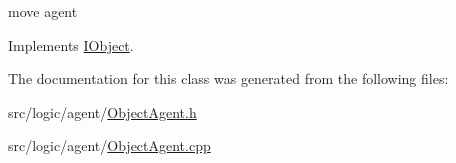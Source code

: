 move agent 



Implements \hyperlink{class_i_object_a1bbc27b2cecbda3cf57fd6ed0099d98a}{I\+Object}.



The documentation for this class was generated from the following files\+:\begin{DoxyCompactItemize}
\item 
src/logic/agent/\hyperlink{_object_agent_8h}{Object\+Agent.\+h}\item 
src/logic/agent/\hyperlink{_object_agent_8cpp}{Object\+Agent.\+cpp}\end{DoxyCompactItemize}
